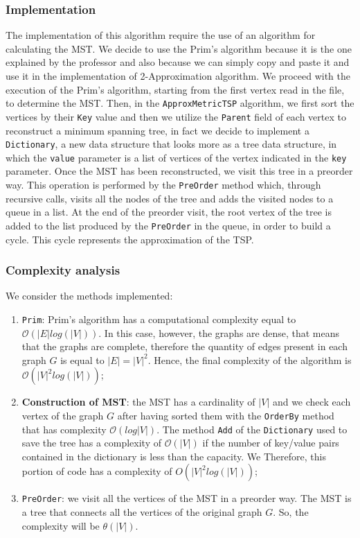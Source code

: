 \subsubsection{Implementation}
The implementation of this algorithm require the use of an algorithm for calculating the MST. We decide to use the Prim's algorithm because it is the one explained by the professor and also because we can simply copy and paste it and use it in the implementation of 2-Approximation algorithm. We proceed with the execution of the Prim's algorithm, starting from the first vertex read in the file, to determine the MST. Then, in the \verb|ApproxMetricTSP| algorithm, we first sort the vertices by their \verb|Key| value and then we utilize the \verb|Parent| field of each vertex to reconstruct a minimum spanning tree, in fact we decide to implement a \verb|Dictionary|, a new data structure that looks more as a tree data structure, in which the \verb|value| parameter is a list of vertices of the vertex indicated in the \verb|key| parameter. Once the MST has been reconstructed, we visit this tree in a preorder way. This operation is performed by the \verb|PreOrder| method which, through recursive calls, visits all the nodes of the tree and adds the visited nodes to a queue in a list. At the end of the preorder visit, the root vertex of the tree is added to the list produced by the \verb|PreOrder| in the queue, in order to build a cycle. This cycle represents the approximation of the TSP.


\subsubsection{Complexity analysis}
We consider the methods implemented:
\begin{enumerate}
    \item \verb|Prim|: Prim's algorithm has a computational complexity equal to $\mathcal{O}(|E| log(|V|))$. In this case, however, the graphs are dense, that means that the graphs are complete, therefore the quantity of edges present in each graph $G$ is equal to $|E| = |V|^2$. Hence, the final complexity of the algorithm is $\mathcal{O}(|V|^2 log(|V|))$;
    \item \textbf{Construction of MST}: the MST has a cardinality of $|V|$ and we check each vertex of the graph $G$ after having sorted them with the \verb|OrderBy| method that has complexity $\mathcal{O}(log |V|)$. The method \verb|Add| of the \verb|Dictionary| used to save the tree has a complexity of $\mathcal{O}(|V|)$ if the number of key/value pairs contained in the dictionary is less than the capacity. We  Therefore, this portion of code has a complexity of $ O(|V|^2 log (|V|))$;
    \item \verb|PreOrder|: we visit all the vertices of the MST in a preorder way. The MST is a tree that connects all the vertices of the original graph $G$. So, the
     complexity will be $\theta(|V|)$.
\end{enumerate}
